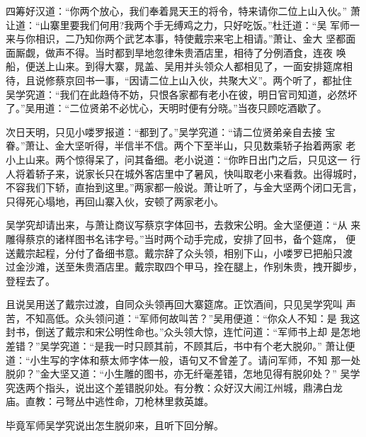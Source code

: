 四筹好汉道：“你两个放心，我们奉着晁天王的将令，特来请你二位上山入伙。”
萧让道：“山寨里要我们何用?我两个手无缚鸡之力，只好吃饭。”杜迁道：“吴
军师一来与你相识，二乃知你两个武艺本事，特使戴宗来宅上相请。”萧让、金大
坚都面面厮觑，做声不得。当时都到旱地忽律朱贵酒店里，相待了分例酒食，连夜
唤船，便送上山来。到得大寨，晁盖、吴用并头领众人都相见了，一面安排筵席相
待，且说修蔡京回书一事，“因请二位上山入伙，共聚大义”。两个听了，都扯住
吴学究道：“我们在此趋侍不妨，只恨各家都有老小在彼，明日官司知道，必然坏
了。”吴用道：“二位贤弟不必忧心，天明时便有分晓。”当夜只顾吃酒歇了。

次日天明，只见小喽罗报道：“都到了。”吴学究道：“请二位贤弟亲自去接
宝眷。”萧让、金大坚听得，半信半不信。两个下至半山，只见数乘轿子抬着两家
老小上山来。两个惊得呆了，问其备细。老小说道：“你昨日出门之后，只见这一
行人将着轿子来，说家长只在城外客店里中了暑风，快叫取老小来看救。出得城时，
不容我们下轿，直抬到这里。”两家都一般说。萧让听了，与金大坚两个闭口无言，
只得死心塌地，再回山寨入伙，安顿了两家老小。

吴学究却请出来，与萧让商议写蔡京字体回书，去救宋公明。金大坚便道：“从
来雕得蔡京的诸样图书名讳字号。”当时两个动手完成，安排了回书，备个筵席，
便送戴宗起程，分付了备细书意。戴宗辞了众头领，相别下山，小喽罗已把船只渡
过金沙滩，送至朱贵酒店里。戴宗取四个甲马，拴在腿上，作别朱贵，拽开脚步，
登程去了。

且说吴用送了戴宗过渡，自同众头领再回大寨筵席。正饮酒间，只见吴学究叫
声苦，不知高低。众头领问道：“军师何故叫苦？”吴用便道：“你众人不知：是
我这封书，倒送了戴宗和宋公明性命也。”众头领大惊，连忙问道：“军师书上却
是怎地差错？”吴学究道：“是我一时只顾其前，不顾其后，书中有个老大脱卯。”
萧让便道：“小生写的字体和蔡太师字体一般，语句又不曾差了。请问军师，不知
那一处脱卯？”金大坚又道：“小生雕的图书，亦无纤毫差错，怎地见得有脱卯处？”
吴学究迭两个指头，说出这个差错脱卯处。有分教：众好汉大闹江州城，鼎沸白龙
庙。直教：弓弩丛中逃性命，刀枪林里救英雄。

毕竟军师吴学究说出怎生脱卯来，且听下回分解。
